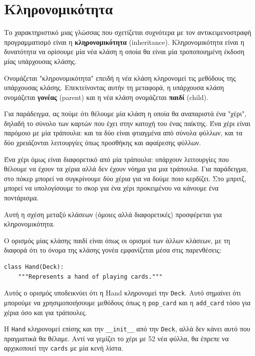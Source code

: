 \documentclass[10pt]{book}
\begin{document}
\section{Κληρονομικότητα}

Το χαρακτηριστικό μιας γλώσσας που σχετίζεται συχνότερα με τον αντικειμενοστραφή
προγραμματισμό είναι η {\bf κληρονομικότητα} (inheritance). Κληρονομικότητα είναι η δυνατότητα να
ορίσουμε μία νέα κλάση η οποία θα είναι μία τροποποιημένη έκδοση μίας υπάρχουσας κλάσης.

Ονομάζεται "κληρονομικότητα" επειδή η νέα κλάση κληρονομεί τις μεθόδους 
της υπάρχουσας κλάσης. Επεκτείνοντας αυτήν τη μεταφορά, η υπάρχουσα κλάση ονομάζεται 
{\bf γονέας} (parent) και η νέα κλάση ονομάζεται {\bf παιδί} (child).

Για παράδειγμα, ας πούμε ότι θέλουμε μία κλάση η οποία θα αναπαριστά ένα 
"χέρι", δηλαδή το σύνολο των καρτών που έχει στην κατοχή του ένας 
παίκτης. Ένα χέρι είναι παρόμοιο με μία τράπουλα: και τα δύο είναι φτιαγμένα 
από σύνολα φύλλων, και τα δύο χρειάζονται λειτουργίες όπως προσθήκης και αφαίρεσης φύλλων.

Ένα χέρι όμως είναι διαφορετικό από μία τράπουλα: υπάρχουν λειτουργίες που
θέλουμε να έχουν τα χέρια αλλά δεν έχουν νόημα για μια τράπουλα. Για παράδειγμα, στο 
πόκερ μπορεί να συγκρίνουμε δύο χέρια για να δούμε ποιο κερδίζει. Στο μπριτζ, μπορεί να 
υπολογίσουμε το σκορ για ένα χέρι προκειμένου να κάνουμε ένα ποντάρισμα.

Αυτή η σχέση μεταξύ κλάσεων (όμοιες αλλά διαφορετικές) προσφέρεται για κληρονομικότητα.

Ο ορισμός μίας κλάσης παιδί είναι όπως οι ορισμοί των άλλων κλάσεων, με τη διαφορά ότι 
το όνομα της κλάσης γονέα εμφανίζεται μέσα στις παρενθέσεις:

\begin{verbatim}
class Hand(Deck):
    """Represents a hand of playing cards."""
\end{verbatim}
%
Αυτός ο ορισμός υποδεικνύει ότι η Hand κληρονομεί την {\tt Deck}.  
Αυτό σημαίνει ότι μπορούμε να χρησιμοποιήσουμε μεθόδους όπως η \verb"pop_card" και η \verb"add_card"
τόσο για χέρια όσο και για τράπουλες.

Η {\tt Hand} κληρονομεί επίσης και την \verb"__init__" από την {\tt Deck}, αλλά δεν κάνει αυτό που
πραγματικά θα θέλαμε. Αντί να γεμίζει το χέρι με 52 νέα φύλλα, θα έπρεπε να αρχικοποιεί την {\tt cards}
με μία κενή λίστα.
\end{document}

